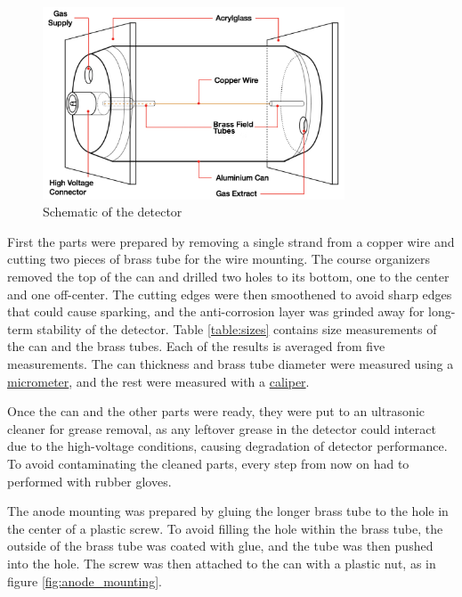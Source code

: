 \documentclass[a4paper]{article}
\begin{document}
\begin{figure}[ht!]
\centering
\includegraphics[width=0.8\textwidth]{fig/instructions/schematic.png}
\caption{Schematic of the detector \cite{instructions}}
\label{fig:schematic}
\end{figure}

First the parts were prepared by removing a single strand from a copper wire and cutting two pieces of brass tube for the wire mounting.
The course organizers removed the top of the can and drilled two holes to its bottom, one to the center and one off-center.
The cutting edges were then smoothened to avoid sharp edges that could cause sparking, and the anti-corrosion layer was grinded away for long-term stability of the detector.
Table \ref{table:sizes} contains size measurements of the can and the brass tubes.
Each of the results is averaged from five measurements.
The can thickness and brass tube diameter were measured using a
\href{https://en.wikipedia.org/wiki/Micrometer}{micrometer}, and the rest were measured with a
\href{https://en.wikipedia.org/wiki/Calipers}{caliper}.

Once the can and the other parts were ready, they were put to an ultrasonic cleaner for grease removal, as any leftover grease in the detector could interact due to the high-voltage conditions, causing degradation of detector performance.
To avoid contaminating the cleaned parts, every step from now on had to performed with rubber gloves.

The anode mounting was prepared by gluing the longer brass tube to the hole in the center of a plastic screw.
To avoid filling the hole within the brass tube, the outside of the brass tube was coated with glue, and the tube was then pushed into the hole.
The screw was then attached to the can with a plastic nut, as in figure \ref{fig:anode_mounting}.
\end{document}
